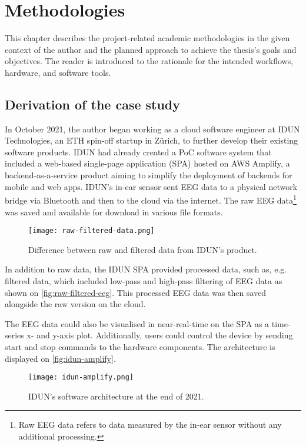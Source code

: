 \chapter{Methodologies}
\graphicspath{{Chapter3/Figs/}{Chapter3/Figs/}}

This chapter describes the project-related academic methodologies in the given context of the author and the planned approach to achieve the thesis's goals and objectives. The reader is introduced to the rationale for the intended workflows, hardware, and software tools.

\section{Derivation of the case study}
\label{chapter3-derivation-of-the-case-study}

In October 2021, the author began working as a cloud software engineer at IDUN Technologies, an ETH spin-off startup in Zürich, to further develop their existing software products. IDUN had already created a PoC software system that included a web-based single-page application (SPA) hosted on AWS Amplify, a backend-as-a-service product aiming to simplify the deployment of backends for mobile and web apps. IDUN's in-ear sensor sent EEG data to a physical network bridge via Bluetooth and then to the cloud via the internet. The raw EEG data\footnote{Raw EEG data refers to data measured by the in-ear sensor without any additional processing.} was saved and available for download in various file formats.

\begin{figure}[!ht]
  \centering
  \texttt{[image: raw-filtered-data.png]}
  \caption{Difference between raw and filtered data from IDUN's product.}
  \label{fig:raw-filtered-eeg}
\end{figure}

In addition to raw data, the IDUN SPA provided processed data, such as, e.g. filtered data, which included low-pass and high-pass filtering of EEG data as shown on \autoref{fig:raw-filtered-eeg}. This processed EEG data was then saved alongside the raw version on the cloud.

The EEG data could also be visualised in near-real-time on the SPA as a time-series x- and y-axis plot. Additionally, users could control the device by sending start and stop commands to the hardware components. The architecture is displayed on \autoref{fig:idun-amplify}.

\begin{figure}[!ht]
  \centering
  \texttt{[image: idun-amplify.png]}
  \caption{IDUN's software architecture at the end of 2021.}
  \label{fig:idun-amplify}
\end{figure}

